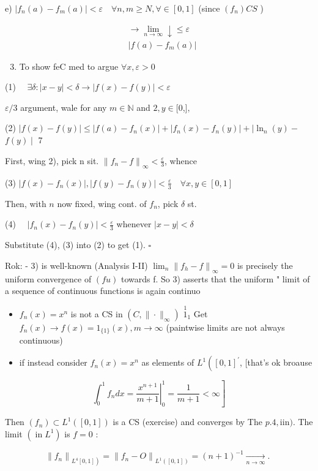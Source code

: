 \documentclass[10pt]{article}
\begin{document}
e) $\left|f_{n}(a)-f_{m}(a)\right|<\varepsilon \quad \forall n, m \geqslant N, \forall \in[0,1]$ (since $\left(f_{n}\right) C S$ )

$$
\begin{aligned}
& \rightarrow \lim _{n \rightarrow \infty} \downarrow \leqslant \varepsilon \\
& \left|f(a)-f_{m}(a)\right|
\end{aligned}
$$

\begin{enumerate}
  \setcounter{enumi}{2}
  \item To show feC med to argue $\forall x, \varepsilon>0$
\end{enumerate}

(1) $\quad \exists \delta:|x-y|<\delta \rightarrow|f(x)-f(y)|<\varepsilon$

$\varepsilon / 3$ argument, wale for any $m \in \mathbb{N}$ and $2, y \in[0$,$] ,$

(2) $|f(x)-f(y)| \leqslant\left|f(a)-f_{n}(x)\right|+\left|f_{n}(x)-f_{n}(y)\right|+\mid \ln _{n}(y)-$ $f(y) \mid$ 7

First, wing 2), pick n sit. $\left\|f_{n}-f\right\|_{\infty}<\frac{\varepsilon}{3}$, whence

(3) $\left|f(x)-f_{n}(x)\right|,\left|f(y)-f_{n}(y)\right|<\frac{\varepsilon}{3} \quad \forall x, y \in[0,1]$

Then, with $n$ now fixed, wing cont. of $f_{n}$, pick $\delta$ st.

(4) $\quad\left|f_{n}(x)-f_{n}(y)\right|<\frac{\varepsilon}{3}$ whenever $|x-y|<\delta$

Substitute (4), (3) into (2) to get (1). $\square$

Rok: - 3) is well-known (Analysis I-II) $\lim _{n}\left\|f_{h}-f\right\|_{\infty}=0$ is precisely the uniform convergence of $(f u)$ towards f. So 3) asserts that the uniform " limit of a sequence of continuous functions is again continuo

\begin{itemize}
  \item $f_{n}(x)=x^{n}$ is not a CS in $\left(C,\|\cdot\|_{\infty}\right)$ $\stackrel{1}{1}_{1}$ Get $f_{n}(x) \rightarrow f(x)=1_{\{1\}}(x), m \rightarrow \infty$ (paintwise limits are not always continuous)

  \item if instead consider $f_{n}(x)=x^{n}$ as elements of $L^{1}\left([0,1]^{\prime}\right.$, [that's ok broause

\end{itemize}

$$
\left.\int_{0}^{1} f_{n} d x=\left.\frac{x^{n+1}}{m+1}\right|_{0} ^{1}=\frac{1}{m+1}<\infty\right]
$$

Then $\left(f_{n}\right) \subset L^{1}([0,1])$ is a CS (exercise) and converges by The $p .4, \mathrm{iin})$. The limit $\left(\operatorname{in} L^{1}\right)$ is $f=0$ :

$$
\left\|f_{n}\right\|_{\left.L^{4}[0,1]\right)}=\left\|f_{n}-O\right\|_{L^{1}([0,1])}=(n+1)^{-1} \underset{n \rightarrow \infty}{\rightarrow} \text {. }
$$
\end{document}
